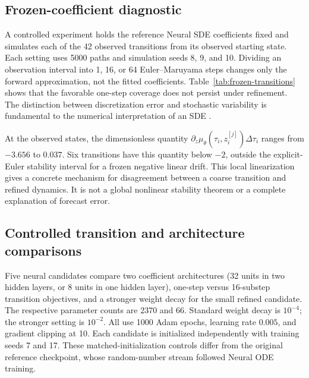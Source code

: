 \subsection{Frozen-coefficient diagnostic}

    A controlled experiment holds the reference Neural SDE coefficients fixed
    and simulates each of the 42 observed transitions from its observed starting
    state. Each setting uses 5000 paths and simulation seeds 8, 9, and 10.
    Dividing an observation interval into 1, 16, or 64 Euler--Maruyama steps
    changes only the forward approximation, not the fitted coefficients.
    Table~\ref{tab:frozen-transitions} shows that the favorable one-step
    coverage does not persist under refinement. The distinction between
    discretization error and stochastic variability is fundamental to the
    numerical interpretation of an SDE \citep{higham2001algorithmic}.



    At the observed states, the dimensionless quantity
    \(\partial_z\mu_\theta(\tau_i,z_i^{[j]})\Delta\tau_i\) ranges from
    \(-3.656\) to \(0.037\). Six transitions have this quantity below \(-2\),
    outside the explicit-Euler stability interval for a frozen negative linear
    drift. This local linearization gives a concrete mechanism for disagreement
    between a coarse transition and refined dynamics. It is not a global
    nonlinear stability theorem or a complete explanation of forecast error.

\subsection{Controlled transition and architecture comparisons}

    Five neural candidates compare two coefficient architectures (32 units in
    two hidden layers, or 8 units in one hidden layer), one-step versus
    16-substep transition objectives, and a stronger weight decay for the small
    refined candidate. The respective parameter counts are 2370 and 66.
    Standard weight decay is \(10^{-4}\); the stronger setting is \(10^{-2}\).
    All use 1000 Adam epochs, learning rate \(0.005\), and gradient clipping at
    10. Each candidate is initialized independently with training seeds 7 and
    17. These matched-initialization controls differ from the original reference
    checkpoint, whose random-number stream followed Neural ODE training.

